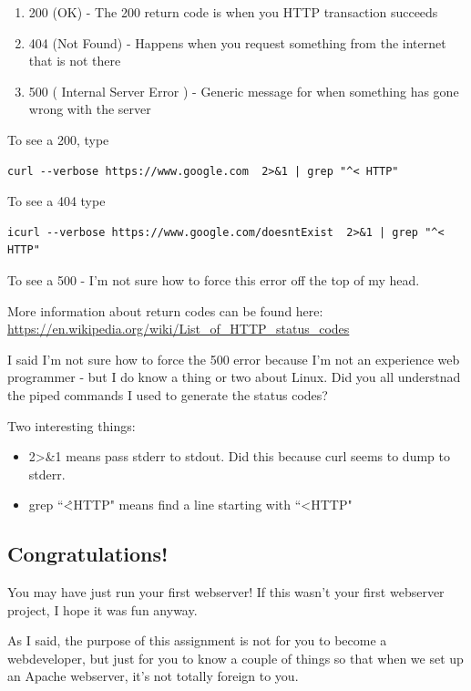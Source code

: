 \documentclass[10pt]{article}
\begin{document}
\begin{enumerate}
\item 200 (OK) - The 200 return code is when you HTTP transaction succeeds
\item 404 (Not Found) - Happens when you request something from the internet that is not there
\item 500 ( Internal Server Error ) - Generic message for when something has gone wrong with the server
\end{enumerate}

To see a 200, type
\begin{lstlisting}
curl --verbose https://www.google.com  2>&1 | grep "^< HTTP"
\end{lstlisting}

To see a 404 type
\begin{lstlisting}
icurl --verbose https://www.google.com/doesntExist  2>&1 | grep "^< HTTP"
\end{lstlisting}

To see a 500 - I'm not sure how to force this error off the top of my head.

More information about return codes can be found here:
\url{https://en.wikipedia.org/wiki/List_of_HTTP_status_codes}

I said I'm not sure how to force the 500 error because I'm not an experience web programmer - but I do know a thing or two about Linux. Did you all understnad the piped commands I used to generate the status codes?

Two interesting things:

\begin{itemize}
\item 2\textgreater\&1 means pass stderr to stdout. Did this because curl seems to dump to stderr.
\item grep ``\^\textless HTTP" means find a line starting with ``\textless HTTP"
\end{itemize}

\subsection{Congratulations!}
You may have just run your first webserver! If this wasn't your first webserver project, I hope it was fun anyway.

As I said, the purpose of this assignment is not for you to become a webdeveloper, but just for you to know a couple of things so that when we set up an Apache webserver, it's not totally foreign to you.
\end{document}
